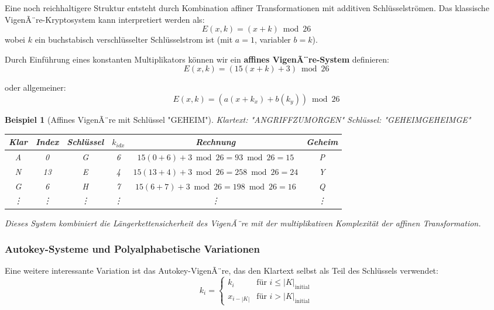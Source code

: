 ﻿\documentclass[12pt,a4paper]{article}
\newtheorem{example}{Beispiel}
\begin{document}
	Eine noch reichhaltigere Struktur entsteht durch Kombination affiner Transformationen mit additiven Schlüsselströmen. Das klassische VigenÃ¨re-Kryptosystem kann interpretiert werden als:
	\begin{equation}
		E(x, k) = (x + k) \bmod 26
	\end{equation}
	wobei $k$ ein buchstabisch verschlüsselter Schlüsselstrom ist (mit $a = 1$, variabler $b = k$).
	
	Durch Einführung eines konstanten Multiplikators können wir ein \textbf{affines VigenÃ¨re-System} definieren:
	\begin{equation}
		E(x, k) = (15(x + k) + 3) \bmod 26
	\end{equation}
	
	oder allgemeiner:
	\begin{equation}
		E(x, k) = (a(x + k_x) + b(k_y)) \bmod 26
	\end{equation}
	
	\begin{example}[Affines VigenÃ¨re mit Schlüssel "GEHEIM"]
		Klartext: "ANGRIFFZUMORGEN"
		Schlüssel: "GEHEIMGEHEIMGE"
		
		\begin{center}
			\small
			\begin{tabular}{|c|c|c|c|c|c|}
				\hline
				Klar & Index & Schlüssel & $k_{idx}$ & Rechnung & Geheim \\
				\hline
				A & 0 & G & 6 & $15(0+6)+3 \bmod 26 = 93 \bmod 26 = 15$ & P \\
				N & 13 & E & 4 & $15(13+4)+3 \bmod 26 = 258 \bmod 26 = 24$ & Y \\
				G & 6 & H & 7 & $15(6+7)+3 \bmod 26 = 198 \bmod 26 = 16$ & Q \\
				\vdots & \vdots & \vdots & \vdots & \vdots & \vdots \\
				\hline
			\end{tabular}
		\end{center}
		
		Dieses System kombiniert die Längerkettensicherheit des VigenÃ¨re mit der multiplikativen Komplexität der affinen Transformation.
	\end{example}
	
	\subsubsection{Autokey-Systeme und Polyalphabetische Variationen}
	
	Eine weitere interessante Variation ist das Autokey-VigenÃ¨re, das den Klartext selbst als Teil des Schlüssels verwendet:
	\begin{equation}
		k_i = \begin{cases}
			k_i & \text{für } i \leq |K|_{\text{initial}} \\
			x_{i-|K|} & \text{für } i > |K|_{\text{initial}}
		\end{cases}
	\end{equation}
	
\end{document}
